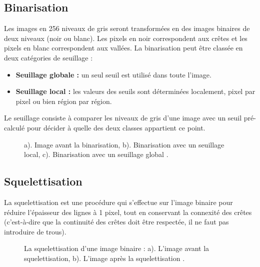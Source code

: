 \subsection{Binarisation}
Les images en 256 niveaux de gris seront transformées en des images binaires de deux niveaux (noir ou blanc). Les pixels en noir correspondent aux crêtes et les pixels en blanc correspondent aux vallées. La binarisation peut être classée en deux catégories de seuillage : 
\begin{itemize}
	\item \textbf{Seuillage globale :} un seul seuil est utilisé dans toute l’image.
    \item \textbf{Seuillage local :} les valeurs des seuils sont déterminées localement, pixel par pixel ou bien région par région. 
    
\end{itemize}
 Le seuillage consiste à comparer les niveaux de gris d'une image avec un seuil pré-calculé pour décider à quelle des deux classes appartient ce point.
\begin{center}
	\begin{figure}[H]
		\centering
				    \captionsetup{justification=centering}
		\caption{a). Image avant la binarisation, b). Binarisation avec un seuillage local, c). Binarisation avec un seuillage global \citep{saveski2010development}.}
		\label{fig:annexefingerbinar}
	\end{figure}
\end{center}
\subsection{Squelettisation}
La squelettisation est une procédure qui s’effectue sur l’image binaire pour réduire l’épaisseur des lignes à 1 pixel, tout en conservant la connexité des crêtes (c'est-à-dire que la continuité des crêtes doit être respectée, il ne faut pas introduire de trous).
\begin{center}
	\begin{figure}[H]
		\centering
		    \captionsetup{justification=centering}
		\caption{La squelettisation d'une image binaire : a). L’image avant la squelettisation, b). L’image après la squelettisation \citep{maltoni2009handbook}.}
		\label{fig:annexefingersquel}
	\end{figure}
\end{center}
